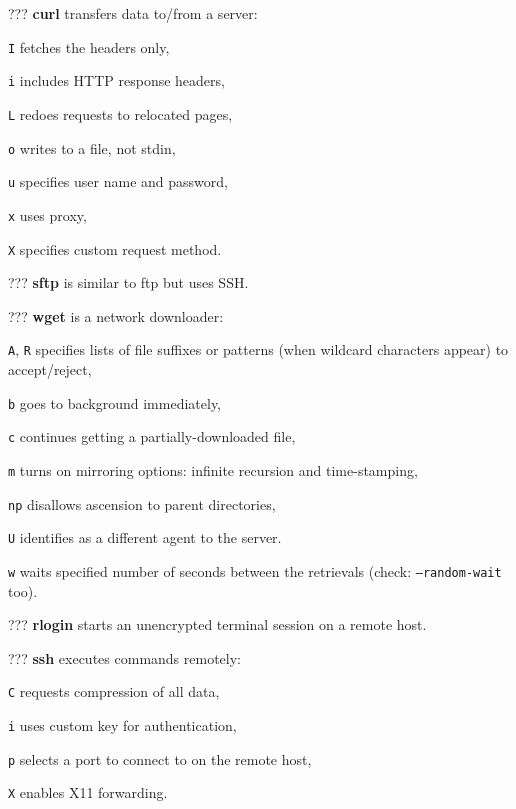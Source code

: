 \begin{compactenum}
\item [???] \textbf{curl} transfers data to/from a server:
\item [\texttt{I}] fetches the headers only,
\item [\texttt{i}] includes HTTP response headers,
\item [\texttt{L}] redoes requests to relocated pages,
\item [\texttt{o}] writes to a file, not stdin,
\item [\texttt{u}] specifies user name and password,
\item [\texttt{x}] uses proxy,
\item [\texttt{X}] specifies custom request method.
\item [???] \textbf{sftp} is similar to ftp but uses SSH.
\item [???] \textbf{wget} is a network downloader:
\item [\texttt{A}, \texttt{R}] specifies lists of file suffixes or patterns (when wildcard characters appear) to accept/reject,
\item [\texttt{b}] goes to background immediately,
\item [\texttt{c}] continues getting a partially-downloaded file,
\item [\texttt{m}] turns on  mirroring options: infinite recursion and time-stamping,
\item [\texttt{np}] disallows ascension to parent directories,
\item [\texttt{U}] identifies as a different agent to the server.
\item [\texttt{w}] waits specified number of seconds between the retrievals (check: \texttt{--random-wait} too).
\item [???] \textbf{rlogin} starts an unencrypted terminal session on a remote host.
\item [???] \textbf{ssh} executes commands remotely:
\item [\texttt{C}] requests compression of all data,
\item [\texttt{i}] uses custom key for authentication,
\item [\texttt{p}] selects a port to connect to on the remote host,
\item [\texttt{X}] enables X11 forwarding.
\end{compactenum}

